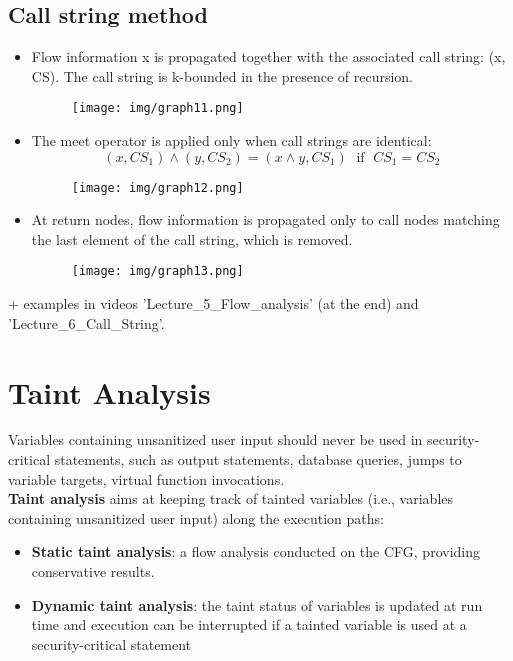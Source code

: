\documentclass[a4paper, 10pt, titlepage]{article}
\begin{document}
\subsection{Call string method}
\begin{itemize}
\item Flow information x is propagated together with the associated call string: (x, CS). The call string is k-bounded in the presence of recursion.
\begin{figure}[h]
\centering
\texttt{[image: img/graph11.png]}
\end{figure}
\item The meet operator is applied only when call strings are identical:
$$(x, CS_1) \wedge (y, CS_2) = (x \wedge y, CS_1) \;\text{ if }\; CS_1 = CS_2$$
\begin{figure}[h]
\centering
\texttt{[image: img/graph12.png]}
\end{figure}
\item At return nodes, flow information is propagated only to call nodes matching the last element of the call string, which is removed.\\
\begin{figure}[h]
\centering
\texttt{[image: img/graph13.png]}
\end{figure}
\end{itemize}
+ examples in videos 'Lecture\_5\_Flow\_analysis' (at the end) and 'Lecture\_6\_Call\_String'.

\newpage
\section{Taint Analysis}
Variables containing unsanitized user input should never be used in security-critical statements, such as output statements, database queries, jumps to variable targets, virtual function invocations. \medskip \\
\textbf{Taint analysis} aims at keeping track of tainted variables (i.e., variables containing unsanitized user input) along the execution paths: 
\begin{itemize}
\item \textbf{Static taint analysis}: a flow analysis conducted on the CFG, providing conservative results.
\item \textbf{Dynamic taint analysis}: the taint status of variables is updated at run time and execution can be interrupted if a tainted variable is used at a security-critical statement
\end{itemize}  
\end{document}
